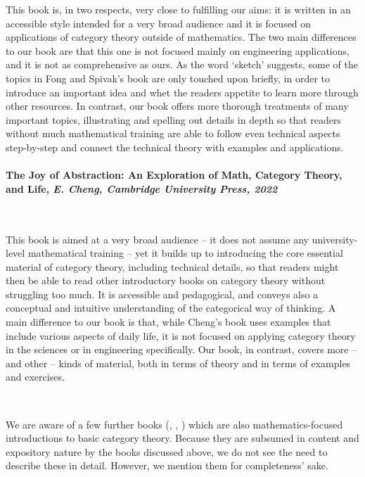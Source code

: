 \documentclass[10pt, article, one side]{memoir}
\begin{document}
    This book is, in two respects, very close to fulfilling our aims: it is written in an accessible style intended for a very broad audience and it is focused on applications of category theory outside of mathematics. The two main differences to our book are that this one is not focused mainly on engineering applications, and it is not as comprehensive as ours. As the word `sketch' suggests, some of the topics in Fong and Spivak's book are only touched upon briefly, in order to introduce an important idea and whet the readers appetite to learn more through other resources. In contrast, our book offers more thorough treatments of many important topics, illustrating and spelling out details in depth so that readers without much mathematical training are able to follow even technical aspects step-by-step and connect the technical theory with examples and applications. 
    
        \paragraph{The Joy of Abstraction: An Exploration of Math, Category Theory, and Life, \emph{E.
            Cheng, Cambridge University Press, 2022}}
            \
            
            This book is aimed at a very broad audience -- it does not assume any university-level mathematical training -- yet it builds up to introducing the core essential material of category theory, including technical details, so that readers might then be able to read other introductory books on category theory without struggling too much. It is accessible and pedagogical, and conveys also a conceptual and intuitive understanding of the categorical way of thinking. A main difference to our book is that, while Cheng's book uses examples that include various aspects of daily life, it is not focused on applying category theory in the sciences or in engineering specifically. Our book, in contrast, covers more -- and other -- kinds of material, both in terms of theory and in terms of examples and exercises. 
                      
 \                   


We are aware of a few further books (\cite{Grandis}, \cite{Roman}, \cite{Simmons}) which are also mathematics-focused introductions to basic category theory. Because they are subsumed in content and expository nature by the books discussed above, we do not see the need to describe these in detail. However, we mention them for completeness' sake. 
\end{document}
